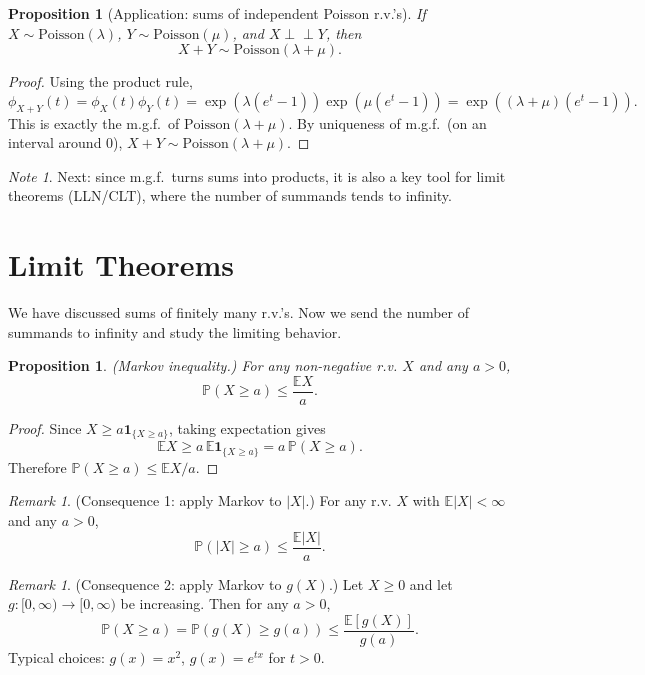 \documentclass[11pt]{article}
\theoremstyle{plain}
\newtheorem{proposition}[theorem]{Proposition}
\theoremstyle{definition}
\theoremstyle{remark}
\newtheorem{remark}[theorem]{Remark}
\newtheorem{note}[theorem]{Note}
\begin{document}
	
	\begin{proposition}[Application: sums of independent Poisson r.v.'s]
		If \(X\sim \mathrm{Poisson}(\lambda)\), \(Y\sim \mathrm{Poisson}(\mu)\), and \(X\perp\!\!\!\perp Y\), then
		\[
		X+Y\sim \mathrm{Poisson}(\lambda+\mu).
		\]
	\end{proposition}
	
	\begin{proof}
		Using the product rule,
		\[
		\phi_{X+Y}(t)=\phi_X(t)\phi_Y(t)
		=\exp(\lambda(e^t-1))\exp(\mu(e^t-1))
		=\exp((\lambda+\mu)(e^t-1)).
		\]
		This is exactly the m.g.f.\ of \(\mathrm{Poisson}(\lambda+\mu)\). By uniqueness of m.g.f.\ (on an interval around \(0\)),
		\(X+Y\sim \mathrm{Poisson}(\lambda+\mu)\).
	\end{proof}
	
	\begin{note}
	Next: since m.g.f.\ turns sums into products, it is also a key tool for limit theorems (LLN/CLT), where the number of summands tends to infinity.
	\end{note}
	
	
\section{Limit Theorems}

We have discussed sums of finitely many r.v.'s.
Now we send the number of summands to infinity and study the limiting behavior.



\begin{proposition}
	(Markov inequality.)
	For any non-negative r.v. \(X\) and any \(a>0\),
	\[
	\mathbb{P}(X\ge a)\le \frac{\mathbb{E}X}{a}.
	\]
\end{proposition}

\begin{proof}
	Since \(X\ge a\mathbf{1}_{\{X\ge a\}}\), taking expectation gives
	\[
	\mathbb{E}X \ge a\,\mathbb{E}\mathbf{1}_{\{X\ge a\}}
	= a\,\mathbb{P}(X\ge a).
	\]
	Therefore \(\mathbb{P}(X\ge a)\le \mathbb{E}X/a\).
\end{proof}

\begin{remark}
	(Consequence 1: apply Markov to \(|X|\).)
	For any r.v. \(X\) with \(\mathbb{E}|X|<\infty\) and any \(a>0\),
	\[
	\mathbb{P}(|X|\ge a)\le \frac{\mathbb{E}|X|}{a}.
	\]
\end{remark}

\begin{remark}
	(Consequence 2: apply Markov to \(g(X)\).)
	Let \(X\ge 0\) and let \(g:[0,\infty)\to[0,\infty)\) be increasing.
	Then for any \(a>0\),
	\[
	\mathbb{P}(X\ge a)=\mathbb{P}(g(X)\ge g(a))\le \frac{\mathbb{E}[g(X)]}{g(a)}.
	\]
	Typical choices: \(g(x)=x^2\), \(g(x)=e^{tx}\) for \(t>0\).
\end{remark}
\end{document}
